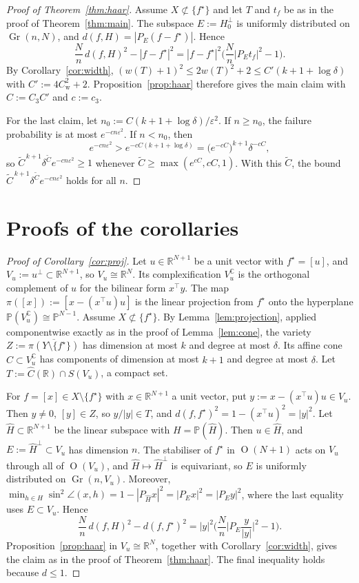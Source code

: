 \documentclass[11pt]{article}
\theoremstyle{definition}
\numberwithin{equation}{section}
\newcommand{\R}{\mathbb{R}}
\newcommand{\C}{\mathbb{C}}
\newcommand{\PP}{\mathbb{P}}
\newcommand{\eps}{\varepsilon}
\newcommand{\fs}{f^{\star}}
\newcommand{\Ch}{\widehat{C}}
\DeclareMathOperator{\Gr}{Gr}
\DeclareMathOperator{\Ort}{O}
\newcommand{\Cw}{C_{\mathrm{w}}}
\begin{document}
\begin{proof}[Proof of Theorem~\ref{thm:haar}]
Assume $X\not\subset\{\fs\}$ and let $T$ and $t_f$ be as in the proof of Theorem~\ref{thm:main}. The subspace $E:=H_0^\perp$ is uniformly distributed on $\Gr(n,N)$, and $d(f,H)=|P_E(f-\fs)|$. Hence
\[
\frac Nn\,d(f,H)^2-|f-\fs|^2=|f-\fs|^2\Big(\frac Nn|P_Et_f|^2-1\Big).
\]
By Corollary~\ref{cor:width}, $(w(T)+1)^2\le2w(T)^2+2\le C'(k+1+\log\delta)$ with $C':=4\Cw^2+2$. Proposition~\ref{prop:haar} therefore gives the main claim with $C:=C_3C'$ and $c:=c_3$.

For the last claim, let $n_0:=C(k+1+\log\delta)/\eps^2$. If $n\ge n_0$, the failure probability is at most $e^{-cn\eps^2}$. If $n<n_0$, then
\[
e^{-cn\eps^2}>e^{-cC(k+1+\log\delta)}=\big(e^{-cC}\big)^{k+1}\delta^{-cC},
\]
so $\widetilde C^{\,k+1}\delta^{\widetilde C}e^{-cn\eps^2}\ge1$ whenever $\widetilde C\ge\max(e^{cC},cC,1)$. With this $\widetilde C$, the bound $\widetilde C^{\,k+1}\delta^{\widetilde C}e^{-cn\eps^2}$ holds for all $n$.
\end{proof}

\section{Proofs of the corollaries}\label{sec:corollaries}

\begin{proof}[Proof of Corollary~\ref{cor:proj}]
Let $u\in\R^{N+1}$ be a unit vector with $\fs=[u]$, and $V_u:=u^\perp\subset\R^{N+1}$, so $V_u\cong\R^N$. Its complexification $V_u^\C$ is the orthogonal complement of $u$ for the bilinear form $x^\top y$. The map $\pi([x]):=[x-(x^\top u)u]$ is the linear projection from $\fs$ onto the hyperplane $\PP(V_u^\C)\cong\PP^{N-1}$. Assume $X\not\subset\{\fs\}$. By Lemma~\ref{lem:projection}, applied componentwise exactly as in the proof of Lemma~\ref{lem:cone}, the variety $Z:=\overline{\pi(Y\setminus\{\fs\})}$ has dimension at most $k$ and degree at most $\delta$. Its affine cone $\Ch\subset V_u^\C$ has components of dimension at most $k+1$ and degree at most $\delta$. Let $T:=\Ch(\R)\cap S(V_u)$, a compact set.

For $f=[x]\in X\setminus\{\fs\}$ with $x\in\R^{N+1}$ a unit vector, put $y:=x-(x^\top u)u\in V_u$. Then $y\ne0$, $[y]\in Z$, so $y/|y|\in T$, and $d(f,\fs)^2=1-(x^\top u)^2=|y|^2$. Let $\widehat H\subset\R^{N+1}$ be the linear subspace with $H=\PP(\widehat H)$. Then $u\in\widehat H$, and $E:=\widehat H^\perp\subset V_u$ has dimension $n$. The stabiliser of $\fs$ in $\Ort(N+1)$ acts on $V_u$ through all of $\Ort(V_u)$, and $\widehat H\mapsto\widehat H^\perp$ is equivariant, so $E$ is uniformly distributed on $\Gr(n,V_u)$. Moreover, $\min_{h\in H}\sin^2\angle(x,h)=1-|P_{\widehat H}x|^2=|P_Ex|^2=|P_Ey|^2$, where the last equality uses $E\subset V_u$. Hence
\[
\frac Nn\,d(f,H)^2-d(f,\fs)^2=|y|^2\Big(\frac Nn\Big|P_E\frac{y}{|y|}\Big|^2-1\Big).
\]
Proposition~\ref{prop:haar} in $V_u\cong\R^N$, together with Corollary~\ref{cor:width}, gives the claim as in the proof of Theorem~\ref{thm:haar}. The final inequality holds because $d\le1$.
\end{proof}
\end{document}

